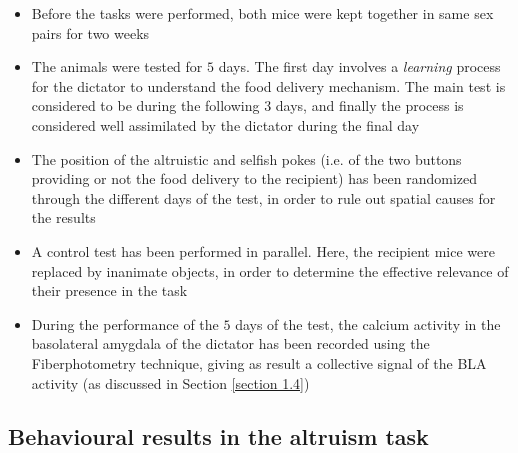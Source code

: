 \documentclass[12pt, a4paper]{article}
\begin{document}
\begin{itemize}
	
	\item Before the tasks were performed, both mice were kept together in same sex pairs for two weeks 
	
	\item The animals were tested for $5$ days. The first day involves a \textit{learning} process for the dictator to understand the food delivery mechanism. The main test is considered to be during the following $3$ days, and finally the process is considered well assimilated by the dictator during the final day	
	
	\item The position of the altruistic and selfish pokes (i.e. of the two buttons providing or not the food delivery to the recipient) has been randomized through the different days of the test, in order to rule out spatial causes for the results
	
	\item A control test has been performed in parallel. Here, the recipient mice were replaced by inanimate objects, in order to determine the effective relevance of their presence in the task
	
	\item During the performance of the $5$ days of the test, the calcium activity in the basolateral amygdala of the dictator has been recorded using the Fiberphotometry technique, giving as result a collective signal of the BLA activity (as discussed in Section \ref{section 1.4})
	
\end{itemize}



\subsection{Behavioural results in the altruism task}
\end{document}

